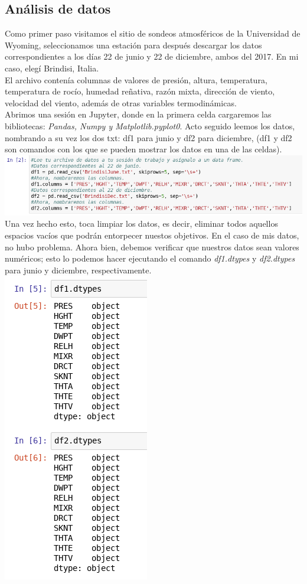 \documentclass{article}
\begin{document}
\begin{doublespace}
\section{Análisis de datos}
Como primer paso visitamos el sitio de sondeos atmosféricos de la Universidad de Wyoming, seleccionamos una estación para después descargar los datos correspondientes a los días 22 de junio y 22 de diciembre, ambos del 2017. En mi caso, elegí Brindisi, Italia. \\
El archivo contenía columnas de valores de presión, altura, temperatura, temperatura de rocío, humedad reñativa, razón mixta, dirección de viento, velocidad del viento, además de otras variables termodinámicas.
\\
Abrimos una sesión en Jupyter, donde en la primera celda cargaremos las bibliotecas: \textit{Pandas, Numpy y Matplotlib.pyplot0}. 
Acto seguido leemos los datos, nombrando a su vez los dos txt: df1 para junio y df2 para diciembre, (df1 y df2 son comandos con los que se pueden mostrar los datos en una de las celdas).
\\
\includegraphics[scale=0.5]{act31.png}
\\
Una vez hecho esto, toca limpiar los datos, es decir, eliminar todos aquellos espacios vacíos que podrán entorpecer nuestos objetivos. En el caso de mis datos, no hubo problema.
Ahora bien, debemos verificar que nuestros datos sean valores numéricos; esto lo podemos hacer ejecutando el comando \textit{df1.dtypes} y \textit{df2.dtypes} para junio y diciembre, respectivamente.
\\
\includegraphics[scale=0.5]{act32.png}

\end{doublespace}
\end{document}
